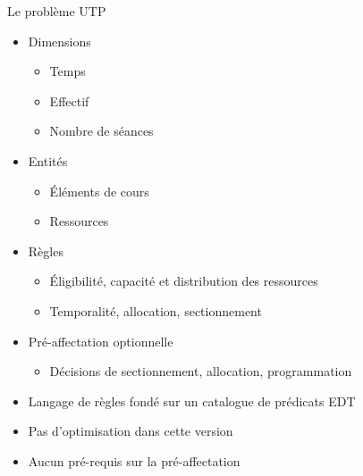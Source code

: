 \documentclass{beamer}
\begin{document}
\begin{frame}{Le problème UTP}
    
    \begin{minipage}[t]{0.49\textwidth}
    \begin{itemize}
        \item Dimensions
        \begin{itemize}
            \item Temps
            \item Effectif
            \item Nombre de séances
        \end{itemize}
        \item Entités
        \begin{itemize}
            \item Éléments de cours
            \item Ressources
        \end{itemize}

    \end{itemize}
    \end{minipage}
    \hfill
    \begin{minipage}[t]{0.49\textwidth}
    \begin{itemize}
        \item Règles
        \begin{itemize}
            \item Éligibilité, capacité et distribution des ressources
            \item Temporalité, allocation, sectionnement
        \end{itemize}
        \item Pré-affectation optionnelle
        \begin{itemize}
        \item Décisions de sectionnement, allocation, programmation
        \end{itemize}
    \end{itemize}

    \end{minipage}
    \vspace{1cm}
        \begin{itemize}
        \item Langage de règles fondé sur un catalogue de prédicats EDT  \item Pas d'optimisation \lbrack dans cette version\rbrack
        \item Aucun pré-requis sur la pré-affectation
    \end{itemize}
\end{frame}
\end{document}
